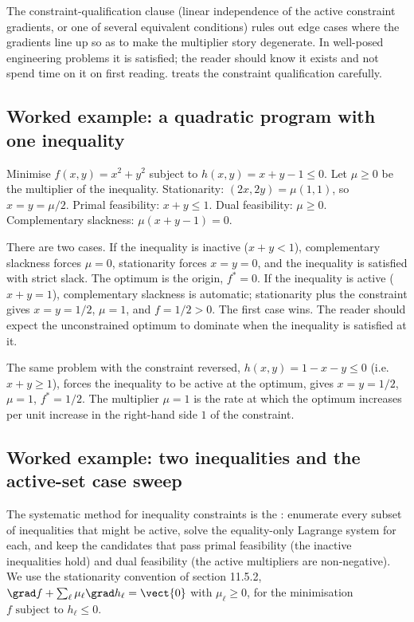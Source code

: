 The constraint-qualification clause (linear independence of the
active constraint gradients, or one of several equivalent
conditions) rules out edge cases where the gradients line up so as
to make the multiplier story degenerate. In well-posed engineering
problems it is satisfied; the reader should know it exists and not
spend time on it on first reading. \textcite{text:boyd-vandenberghe2004}
treats the constraint qualification carefully.

\subsection{Worked example: a quadratic program with one inequality}

Minimise $f(x, y) = x^{2} + y^{2}$ subject to $h(x, y) = x + y - 1
\leq 0$. Let $\mu \geq 0$ be the multiplier of the inequality.
Stationarity: $(2x, 2y) = \mu (1, 1)$, so $x = y = \mu/2$. Primal
feasibility: $x + y \leq 1$. Dual feasibility: $\mu \geq 0$.
Complementary slackness: $\mu (x + y - 1) = 0$.

There are two cases. If the inequality is inactive ($x + y < 1$),
complementary slackness forces $\mu = 0$, stationarity forces
$x = y = 0$, and the inequality is satisfied with strict slack. The
optimum is the origin, $f^{*} = 0$. If the inequality is active
($x + y = 1$), complementary slackness is automatic; stationarity
plus the constraint gives $x = y = 1/2$, $\mu = 1$, and
$f = 1/2 > 0$. The first case wins. The reader should expect the
unconstrained optimum to dominate when the inequality is satisfied
at it.

The same problem with the constraint reversed, $h(x, y) = 1 - x - y
\leq 0$ (i.e.\ $x + y \geq 1$), forces the inequality to be active
at the optimum, gives $x = y = 1/2$, $\mu = 1$, $f^{*} = 1/2$. The
multiplier $\mu = 1$ is the rate at which the optimum increases
per unit increase in the right-hand side $1$ of the constraint.

\subsection{Worked example: two inequalities and the active-set
case sweep}

The systematic method for inequality constraints is the
: enumerate every subset of inequalities
that might be active, solve the equality-only Lagrange system for
each, and keep the candidates that pass primal feasibility (the
inactive inequalities hold) and dual feasibility (the active
multipliers are non-negative). We use the stationarity convention of
section 11.5.2, $\grad f + \sum_{\ell}\mu_{\ell}\grad h_{\ell} =
\vect{0}$ with $\mu_{\ell} \geq 0$, for the minimisation
$f \text{ subject to } h_{\ell} \leq 0$.

